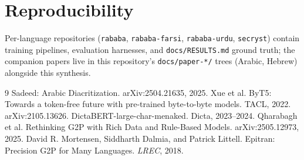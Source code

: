 \documentclass[11pt]{article}
\begin{document}
\section{Reproducibility}
Per-language repositories (\texttt{rababa}, \texttt{rababa-farsi},
\texttt{rababa-urdu}, \texttt{secryst}) contain training pipelines,
evaluation harnesses, and \texttt{docs/RESULTS.md} ground truth; the
companion papers live in this repository's \texttt{docs/paper-*/}
trees (Arabic, Hebrew) alongside this synthesis.

\begin{thebibliography}{9}
 Sadeed: Arabic Diacritization. arXiv:2504.21635, 2025.
 Xue et al. ByT5: Towards a token-free future with
  pre-trained byte-to-byte models. TACL, 2022. arXiv:2105.13626.
 DictaBERT-large-char-menaked. Dicta, 2023--2024.
 Qharabagh et al. Rethinking G2P with Rich Data and
  Rule-Based Models. arXiv:2505.12973, 2025.
 David R. Mortensen, Siddharth Dalmia, and Patrick
  Littell. Epitran: Precision G2P for Many Languages. \emph{LREC}, 2018.
\end{thebibliography}
\end{document}
